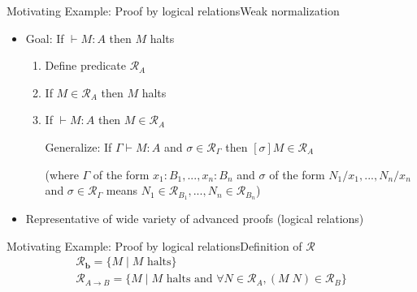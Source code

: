 \documentclass[usenames,dvipsnames]{beamer}
\newcommand{\const}[1]{\textbf{#1}}
\newcommand{\arrow}{\to}
\newcommand{\stepsto}{\longrightarrow}
\begin{document}
\begin{frame}[fragile]{Motivating Example: Proof by logical relations}{Weak normalization}
\begin{itemize}
\item Goal: If $\vdash M : A$ then $M$ halts
\begin{enumerate}
\item Define predicate $\mathcal{R}_A$
\item If $M \in \mathcal{R}_A$ then $M$ halts
\item If $\vdash M : A$ then $M \in \mathcal{R}_A$
\pause

Generalize: {\color{purple}If $\Gamma \vdash M : A$ and $\sigma \in \mathcal{R}_\Gamma$ then $[\sigma]M \in \mathcal{R}_A$}

(where $\Gamma$ of the form $x_1{:}B_1,...,x_n{:}B_n$ and $\sigma$ of the form $N_1/x_1,...,N_n/x_n$ and $\sigma \in \mathcal{R}_\Gamma$ means $N_1 \in \mathcal{R}_{B_1},...,N_n \in \mathcal{R}_{B_n}$)
\end{enumerate}
\pause \item Representative of wide variety of advanced proofs (logical relations)
\end{itemize}

\end{frame}

\begin{frame}{Motivating Example: Proof by logical relations}{Definition of $\mathcal{R}$}
\[
\begin{array}{l}
\mathcal{R}_{\const b} = \{M\; |\; M \text{ halts}\} \\
\mathcal{R}_{A \arrow B} = \{M\; |\; M \text{ halts and } \forall N
\in \mathcal{R}_A, (M\; N) \in \mathcal{R}_B \}
\end{array}
\]
\end{frame}
\end{document}
